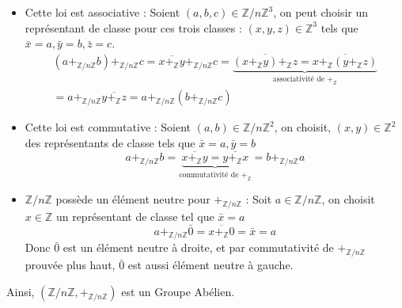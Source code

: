 \documentclass{article}
\renewenvironment{question_kholle}[2][ ]
{
	\subsection{\texorpdfstring{#2}{}}
	\notblank{#1}
	{
		\noindent #1
		\bigbreak
	}
	{}
	\begin{proof}
}
{
	\end{proof}
}
\begin{document}
\begin{question_kholle}
\begin{itemize}[label=$\star$]
\begin{itemize}[label=$\bullet$]
			      \item Cette loi est associative :
			            Soient $(a, b, c) \in \mathbb{Z}/n\mathbb{Z}^{3}$, on peut choisir un représentant de classe pour ces trois classes : $(x,y, z) \in \mathbb{Z}^{3}$ tels que $\bar{x} = a, \bar{y} = b, \bar{z} = c$.
			            \begin{multline*}
				            (a +_{\mathbb{Z}/n\mathbb{Z}} b)+_{\mathbb{Z}/n\mathbb{Z}} c =  \overline{x+_{\mathbb{Z}}y} +_{\mathbb{Z}/n\mathbb{Z}} c = \underbrace{ \overline{(x+_{\mathbb{Z}}y) +_{\mathbb{Z}} z}= \overline{x+_{\mathbb{Z}}(y+_{\mathbb{Z}}z)} }_{ \text{associativité de }+_{\mathbb{Z}} } \\
				            =  a +_{\mathbb{Z}/n\mathbb{Z}}\overline{y +_{\mathbb{Z}} z} = a +_{\mathbb{Z}/n\mathbb{Z}} (b +_{\mathbb{Z}/n\mathbb{Z}} c)
			            \end{multline*}
			      \item Cette loi est commutative :
			            Soient $(a, b) \in \mathbb{Z}/n\mathbb{Z}^{2}$, on choisit, $(x, y) \in \mathbb{Z}^{2}$ des représentants de classe tels que $\bar{x} = a, \bar{y} = b$
			            $$
				            a+_{\mathbb{Z}/n\mathbb{Z}}b = \underbrace{ \overline{x +_{\mathbb{Z}} y} = \overline{y+_{\mathbb{Z}}x} }_{ \text{commutativité de } +_{\mathbb{Z}} } = b +_{\mathbb{Z}/n\mathbb{Z}}a
			            $$
			      \item $\mathbb{Z}/n\mathbb{Z}$ possède un élément neutre pour $+_{\mathbb{Z}/n\mathbb{Z}}$ :
			            Soit $a \in \mathbb{Z}/n\mathbb{Z}$, on choisit $x \in \mathbb{Z}$ un représentant de classe tel que $\bar{x} = a$
			            $$
				            a +_{\mathbb{Z}/n\mathbb{Z}} \bar{0} = \overline{x+_{\mathbb{Z}}0} = \bar{x} = a
			            $$
			            Donc $\bar{0}$ est un élément neutre à droite, et par commutativité de $+_{\mathbb{Z}/n\mathbb{Z}}$ prouvée plus haut, $\bar{0}$ est aussi élément neutre à gauche.
		      \end{itemize}
		      Ainsi, $(\mathbb{Z}/n\mathbb{Z}, +_{\mathbb{Z}/n\mathbb{Z}})$ est un Groupe Abélien.
	\end{itemize}
\end{question_kholle}
\end{document}
